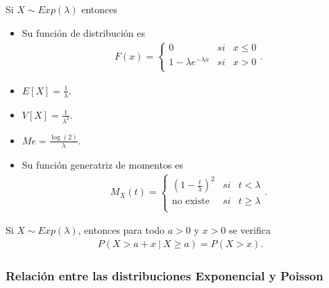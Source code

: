 \begin{obs}
    Si $X \sim Exp(\lambda)$ entonces
    \begin{itemize}
        \item Su función de distribución es
              \begin{align*}
                  F(x) = \left\{ \begin{array}{lcc}
                                     0                          & si & x \leq 0 \\
                                     1 - \lambda e^{-\lambda x} & si & x > 0    \\
                                 \end{array}
                  \right. .
              \end{align*}
        \item $E[X] = \frac{1}{\lambda}$.
        \item $V[X] = \frac{1}{\lambda^2}$.
        \item $Me = \frac{\log(2)}{\lambda}$.
        \item Su función generatriz de momentos es
              \begin{align*}
                  M_X(t) = \left\{ \begin{array}{lcc}
                                       \left( 1 - \frac{t}{\lambda} \right)^2 & si & t < \lambda   \\
                                       \text{no existe}                       & si & t \ge \lambda \\
                                   \end{array}
                  \right. .
              \end{align*}
    \end{itemize}
\end{obs}

\begin{teo}
    Si $X \sim Exp(\lambda)$, entonces para todo $a > 0$ y $x > 0$ se verifica
    \begin{align*}
        P(X > a + x \ | \ X \ge a) = P(X > x).
    \end{align*}
\end{teo}

\subsubsection{Relación entre las distribuciones Exponencial y Poisson}

